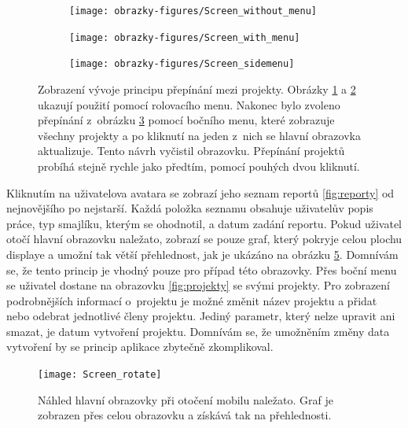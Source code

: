 \begin{figure}[H]
    \centering
    \begin{subfigure}[b]{0.2\textwidth}
        \texttt{[image: obrazky-figures/Screen\_without\_menu]}
        \caption{}
        \label{fig:without_menu}
    \end{subfigure}
    \begin{subfigure}[b]{0.2\textwidth}
        \texttt{[image: obrazky-figures/Screen\_with\_menu]}
        \caption{}
        \label{fig:with_menu}
    \end{subfigure}
    \begin{subfigure}[b]{0.2\textwidth}
        \texttt{[image: obrazky-figures/Screen\_sidemenu]}
        \caption{}
        \label{fig:sidemenu}
    \end{subfigure}
    \caption{Zobrazení vývoje principu přepínání mezi projekty. Obrázky \ref{fig:without_menu} a \ref{fig:with_menu} ukazují použití pomocí rolovacího menu. Nakonec bylo zvoleno přepínání z~obrázku \ref{fig:sidemenu} pomocí bočního menu, které zobrazuje všechny projekty a po kliknutí na jeden z~nich se hlavní obrazovka aktualizuje. Tento návrh vyčistil obrazovku. Přepínání projektů probíhá stejně rychle jako předtím, pomocí pouhých dvou kliknutí.}
    \label{fig:menus}
\end{figure}

Kliknutím na uživatelova avatara se zobrazí jeho seznam reportů \ref{fig:reporty} od nejnovějšího po nejstarší. Každá položka seznamu obsahuje uživatelův popis práce, typ smajlíku, kterým se ohodnotil, a datum zadání reportu. Pokud uživatel otočí hlavní obrazovku naležato, zobrazí se pouze graf, který pokryje celou plochu displaye a umožní tak větší přehlednost, jak je ukázáno na obrázku \ref{nalezato}. Domnívám se, že tento princip je vhodný pouze pro případ této obrazovky. Přes boční menu se uživatel dostane na obrazovku \ref{fig:projekty} se svými projekty. Pro zobrazení podrobnějších informací o~projektu je možné změnit název projektu a přidat nebo odebrat jednotlivé členy projektu. Jediný parametr, který nelze upravit ani smazat, je datum vytvoření projektu. Domnívám se, že umožněním změny data vytvoření by se princip aplikace zbytečně zkomplikoval. 

\begin{figure}[b]
\centering
\texttt{[image: Screen\_rotate]}
\caption{Náhled hlavní obrazovky při otočení mobilu naležato. Graf je zobrazen přes celou obrazovku a získává tak na přehlednosti.}
\label{nalezato}
\end{figure}
 
